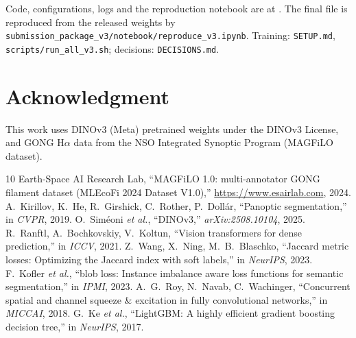 \begin{flushleft}
Code, configurations, logs and the reproduction notebook are at \repourl. The final file is reproduced from the
released weights by \nolinkurl{submission_package_v3/notebook/reproduce_v3.ipynb}. Training: \texttt{SETUP.md},
\texttt{scripts/run\_all\_v3.sh}; decisions: \texttt{DECISIONS.md}.
\end{flushleft}

\section*{Acknowledgment}
This work uses DINOv3 (Meta) pretrained weights under the DINOv3 License, and GONG H$\alpha$ data from the NSO
Integrated Synoptic Program (MAGFiLO dataset).

\begin{thebibliography}{10}
 Earth-Space AI Research Lab, ``MAGFiLO 1.0: multi-annotator GONG filament dataset (MLEcoFi 2024
Dataset V1.0),'' \url{https://www.esairlab.com}, 2024.
 A.~Kirillov, K.~He, R.~Girshick, C.~Rother, P.~Doll\'ar, ``Panoptic segmentation,''
in \emph{CVPR}, 2019.
 O.~Sim\'eoni \emph{et al.}, ``DINOv3,'' \emph{arXiv:2508.10104}, 2025.
 R.~Ranftl, A.~Bochkovskiy, V.~Koltun, ``Vision transformers for dense prediction,'' in
\emph{ICCV}, 2021.
 Z.~Wang, X.~Ning, M.~B.~Blaschko, ``Jaccard metric losses: Optimizing the Jaccard index with
soft labels,'' in \emph{NeurIPS}, 2023.
 F.~Kofler \emph{et al.}, ``blob loss: Instance imbalance aware loss functions for semantic
segmentation,'' in \emph{IPMI}, 2023.
 A.~G.~Roy, N.~Navab, C.~Wachinger, ``Concurrent spatial and channel squeeze \& excitation in
fully convolutional networks,'' in \emph{MICCAI}, 2018.
 G.~Ke \emph{et al.}, ``LightGBM: A highly efficient gradient boosting decision tree,'' in
\emph{NeurIPS}, 2017.
\end{thebibliography}


